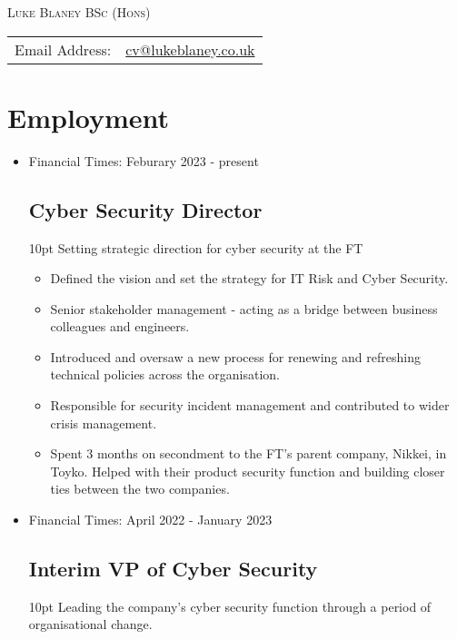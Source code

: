 \documentclass[a4paper]{article}
\newenvironment{detail}{\begin{adjustwidth}{10pt}{}}{\end{adjustwidth}}
\begin{document}
\begin{center}\textsc{\LARGE Luke Blaney BSc (Hons)}\end{center}

\begin{tabular}{ l l }

Email Address: & \href{mailto:cv@lukeblaney.co.uk}{cv@lukeblaney.co.uk}\\

\end{tabular}

\section*{Employment}

\begin{itemize}


\item Financial Times: Feburary 2023 - present
\subsection*{Cyber Security Director}
\begin{detail}
Setting strategic direction for cyber security at the FT

\begin{itemize}
	\item Defined the vision and set the strategy for IT Risk and Cyber Security.
	\item Senior stakeholder management - acting as a bridge between business colleagues and engineers.
	\item Introduced and oversaw a new process for renewing and refreshing technical policies across the organisation.
	\item Responsible for security incident management and contributed to wider crisis management.
	\item Spent 3 months on secondment to the FT's parent company, Nikkei, in Toyko.  Helped with their product security function and building closer ties between the two companies.
\end{itemize}
\end{detail}

\item Financial Times: April 2022 - January 2023
\subsection*{Interim VP of Cyber Security}
\begin{detail}
Leading the company's cyber security function through a period of organisational change.


\end{detail}
\end{itemize}
\end{document}
